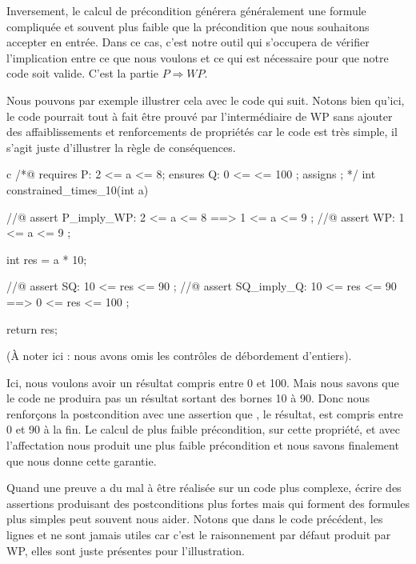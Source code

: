 Inversement, le calcul de précondition générera généralement une formule 
compliquée et souvent plus faible que la précondition que nous souhaitons
accepter en entrée. Dans ce cas, c'est notre outil qui s'occupera de vérifier 
l'implication entre ce que nous voulons et ce qui est nécessaire pour que notre
code soit valide. C'est la partie $P \Rightarrow WP$.



Nous pouvons par exemple illustrer cela avec le code qui suit. Notons bien qu'ici,
le code pourrait tout à fait être prouvé par l'intermédiaire de WP sans ajouter des
affaiblissements et renforcements de propriétés car le code est très simple, il 
s'agit juste d'illustrer la règle de conséquences.



\begin{CodeBlock}{c}
/*@
  requires P: 2 <= a <= 8;
  ensures  Q: 0 <= \result <= 100 ;
  assigns  \nothing ;
*/
int constrained_times_10(int a){
  //@ assert P_imply_WP: 2 <= a <= 8 ==> 1 <= a <= 9 ;
  //@ assert WP:         1 <= a <= 9 ;

  int res = a * 10;

  //@ assert SQ:         10 <= res <= 90 ;
  //@ assert SQ_imply_Q: 10 <= res <= 90 ==> 0 <= res <= 100 ;

  return res;
}
\end{CodeBlock}



(À noter ici : nous avons omis les contrôles de débordement d'entiers).



Ici, nous voulons avoir un résultat compris entre 0 et 100. Mais nous savons que
le code ne produira pas un résultat sortant des bornes 10 à 90. Donc nous 
renforçons la postcondition avec une assertion que , le résultat, est compris
entre 0 et 90 à la fin. Le calcul de plus faible précondition, sur cette propriété,
et avec l'affectation  nous produit une plus faible précondition 
 et nous savons finalement que  nous donne cette garantie.



Quand une preuve a du mal à être réalisée sur un code plus complexe, écrire des
assertions produisant des postconditions plus fortes mais qui forment des formules
plus simples peut souvent nous aider. Notons que dans le code précédent, les lignes
 et  ne sont jamais utiles car c'est le raisonnement par
défaut produit par WP, elles sont juste présentes pour l'illustration.



